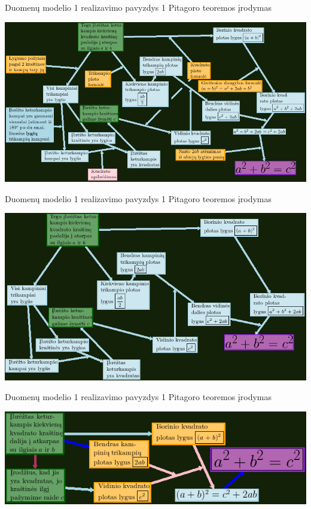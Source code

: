\documentclass[xcolor={dvipsnames}]{beamer}
\begin{document}
\begin{frame}[fragile]{Duomenų modelio 1 realizavimo pavyzdys 1}
Pitagoro teoremos įrodymas

\includegraphics[width=\textwidth]{pyth1.png}
\end{frame}

\begin{frame}[fragile]{Duomenų modelio 1 realizavimo pavyzdys 1}
Pitagoro teoremos įrodymas

\includegraphics[width=\textwidth]{pyth2.png}
\end{frame}

\begin{frame}[fragile]{Duomenų modelio 1 realizavimo pavyzdys 1}
Pitagoro teoremos įrodymas

\includegraphics[width=\textwidth]{pyth3.png}
\end{frame}
\end{document}
